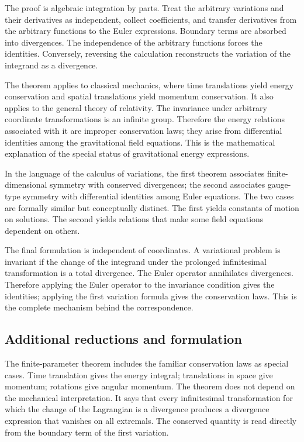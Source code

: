 \documentclass[11pt]{article}
\begin{document}
The proof is algebraic integration by parts. Treat the arbitrary variations and their derivatives as
independent, collect coefficients, and transfer derivatives from the arbitrary functions to the
Euler expressions. Boundary terms are absorbed into divergences. The independence of the arbitrary
functions forces the identities. Conversely, reversing the calculation reconstructs the variation of
the integrand as a divergence.


The theorem applies to classical mechanics, where time translations yield energy conservation and
spatial translations yield momentum conservation. It also applies to the general theory of
relativity. The invariance under arbitrary coordinate transformations is an infinite group.
Therefore the energy relations associated with it are improper conservation laws; they arise from
differential identities among the gravitational field equations. This is the mathematical
explanation of the special status of gravitational energy expressions.


In the language of the calculus of variations, the first theorem associates finite-dimensional
symmetry with conserved divergences; the second associates gauge-type symmetry with differential
identities among Euler equations. The two cases are formally similar but conceptually distinct. The
first yields constants of motion on solutions. The second yields relations that make some field
equations dependent on others.


The final formulation is independent of coordinates. A variational problem is invariant if the
change of the integrand under the prolonged infinitesimal transformation is a total divergence. The
Euler operator annihilates divergences. Therefore applying the Euler operator to the invariance
condition gives the identities; applying the first variation formula gives the conservation laws.
This is the complete mechanism behind the correspondence.


\subsection{Additional reductions and formulation}

The finite-parameter theorem includes the familiar conservation laws as special cases. Time
translation gives the energy integral; translations in space give momentum; rotations give angular
momentum. The theorem does not depend on the mechanical interpretation. It says that every
infinitesimal transformation for which the change of the Lagrangian is a divergence produces a
divergence expression that vanishes on all extremals. The conserved quantity is read directly from
the boundary term of the first variation.
\end{document}
